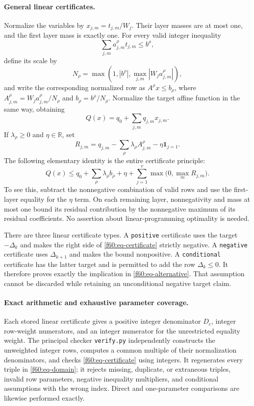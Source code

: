 \paragraph{General linear certificates.}
Normalize the variables by $x_{j,m}=t_{j,m}/W_j$.  Their layer masses
are at most one, and the first layer mass is exactly one.
For every valid integer inequality
\[
 \sum_{j,m}a^{\rho}_{j,m}t_{j,m}\le b^{\rho},
\]
define its scale by
\begin{equation}
 N_\rho=\max\left(1,|b^{\rho}|,
       \max_{j,m}|W_ja^{\rho}_{j,m}|\right),
 \label{f60:eq-row-scale}
\end{equation}
and write the corresponding normalized row as
$A^\rho x\le b_\rho$, where
$A^\rho_{j,m}=W_ja^\rho_{j,m}/N_\rho$ and
$b_\rho=b^\rho/N_\rho$.
Normalize the target affine function in the same way, obtaining
\[
 Q(x)=q_0+\sum_{j,m}q_{j,m}x_{j,m}.
\]
If $\lambda_\rho\ge0$ and $\eta\in\mathbb R$, set
\[
 R_{j,m}=q_{j,m}-\sum_\rho\lambda_\rho A^\rho_{j,m}
                    -\eta\mathbf{1}_{j=1}.
\]
The following elementary identity is the entire certificate principle:
\begin{equation}
 Q(x)\le q_0+\sum_\rho\lambda_\rho b_\rho+\eta
       +\sum_{j=1}^{v}\max\bigl(0,\max_m R_{j,m}\bigr).
 \label{f60:eq-certificate}
\end{equation}
To see this, subtract the nonnegative combination of valid rows and use
the first-layer equality for the $\eta$ term.  On each remaining layer,
nonnegativity and mass at most one bound its residual contribution by
the nonnegative maximum of its residual coefficients.  No assertion
about linear-programming optimality is needed.

There are three linear certificate types.  A \texttt{positive}
certificate uses the target $-\Delta_k$ and makes the right side of
\eqref{f60:eq-certificate} strictly negative.  A \texttt{negative}
certificate uses $\Delta_{k+1}$ and makes the bound nonpositive.  A
\texttt{conditional} certificate has the latter target and is permitted
to add the row $\Delta_k\le0$.  It therefore proves exactly the
implication in \eqref{f60:eq-alternative}.  That assumption cannot be
discarded while retaining an unconditional negative target claim.

\paragraph{Exact arithmetic and exhaustive parameter coverage.}
Each stored linear certificate gives a positive integer denominator
$D_c$, integer row-weight numerators, and an integer numerator for the
unrestricted equality weight.  The principal checker
\texttt{verify.py} independently constructs the unweighted integer
rows, computes a common multiple of their normalization denominators,
and checks \eqref{f60:eq-certificate} using integers.  It regenerates
every triple in \eqref{f60:eq-domain}; it rejects missing, duplicate, or
extraneous triples, invalid row parameters, negative inequality
multipliers, and conditional assumptions with the wrong index.
Direct and one-parameter comparisons are likewise performed exactly.

